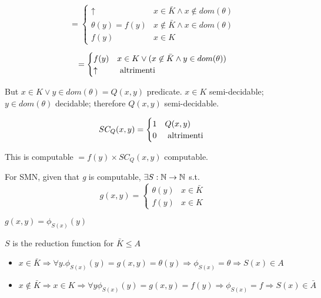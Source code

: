 \begin{equation*}
  = \begin{cases}
    \uparrow         & x \in \bar{K} \land x \not\in dom(\theta) \\
    \theta(y) = f(y) & x \not\in \bar{K} \land x \in dom(\theta) \\
    f(y)             & x\in K
  \end{cases}
\end{equation*}

\begin{equation*}
  = \begin{cases}
    f(y)     & x\in K\lor(x\not\in\bar{K}\land y\in dom(\theta)) \\
    \uparrow & $ altrimenti $
  \end{cases}
\end{equation*}

But $ x\in K\lor y\in dom(\theta) = Q(x,y)$ predicate. $ x\in K $ semi-decidable; $ y \in dom(\theta) $ decidable; therefore $ Q(x,y) $ semi-decidable.

\begin{equation*}
  SC_Q(x,y) = \begin{cases}
    1 & Q(x,y)         \\
    0 & $ altrimenti $
  \end{cases}
\end{equation*}

This is computable $ = f(y) \times SC_Q(x,y) $ computable.

For SMN, given that \textit{g} is computable, $ \exists S:\mathbb{N}\rightarrow\mathbb{N} $ s.t.
\begin{equation*}
  g(x,y) = \begin{cases}
    \theta(y) & x \in \bar{K} \\
    f(y)      & x \in K
  \end{cases}
\end{equation*}

$ g(x,y) = \phi_{S(x)}(y)$

$S$ is the reduction function for $ \bar{K}\leq A $

\begin{itemize}
\item $ x\in\bar{K} \Rightarrow \forall y. \phi_{S(x)}(y) = g(x,y) = \theta(y) \Rightarrow \phi_{S(x)} = \theta \Rightarrow S(x) \in A $
\item $ x\not\in\bar{K}\Rightarrow x\in K\Rightarrow\forall y\phi_{S(x)}(y) = g(x,y)=f(y)\Rightarrow\phi_{S(x)}=f\Rightarrow S(x)\in\bar{A}$
\end{itemize}

